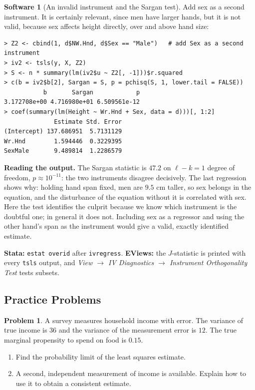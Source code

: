 \documentclass[11pt,a4paper]{article}
\numberwithin{equation}{section}
\theoremstyle{definition}
\newtheorem{software}[thm]{Software}
\newtheorem{problemx}{Problem}[subsection]
\newenvironment{problem}{\begin{problemx}}{\end{problemx}}
\begin{document}
\begin{software}[An invalid instrument and the Sargan test]
\label{sw:sargan}
Add sex as a second instrument. It is certainly relevant, since men have larger hands, but it is not valid, because sex affects height directly,
over and above hand size:
{\small\begin{verbatim}
> Z2 <- cbind(1, d$NW.Hnd, d$Sex == "Male")   # add Sex as a second instrument
> iv2 <- tsls(y, X, Z2)
> S <- n * summary(lm(iv2$u ~ Z2[, -1]))$r.squared
> c(b = iv2$b[2], Sargan = S, p = pchisq(S, 1, lower.tail = FALSE))
           b       Sargan            p 
3.172708e+00 4.716980e+01 6.509561e-12 
> coef(summary(lm(Height ~ Wr.Hnd + Sex, data = d)))[, 1:2]
              Estimate Std. Error
(Intercept) 137.686951  5.7131129
Wr.Hnd        1.594446  0.3229395
SexMale       9.489814  1.2286579
\end{verbatim}}
\textbf{Reading the output.} The Sargan statistic is $47.2$ on $\ell - k = 1$ degree of freedom, $p \approx 10^{-11}$: the two instruments disagree decisively. The last regression
shows why: holding hand span fixed, men are $9.5$ cm taller, so sex belongs in the equation, and the disturbance of the equation without it is correlated
with sex. Here the test identifies the culprit because we know which instrument is the doubtful one; in general it does not. Including sex as a
regressor and using the other hand's span as the instrument would give a valid, exactly identified estimate.

\textbf{Stata:} \texttt{estat overid} after \texttt{ivregress}. \textbf{EViews:} the $J$-statistic is printed with every \texttt{tsls} output, and
\emph{View $\to$ IV Diagnostics $\to$ Instrument Orthogonality Test} tests subsets.
\end{software}

\subsection{Practice Problems}

\begin{problem}
A survey measures household income with error. The variance of true income is $36$ and the variance of the measurement error is $12$. The
true marginal propensity to spend on food is $0.15$.
\begin{enumerate}[label=(\alph*)]
\item Find the probability limit of the least squares estimate.
\item A second, independent measurement of income is available. Explain how to use it to obtain a consistent estimate.
\end{enumerate}
\end{problem}
\end{document}
